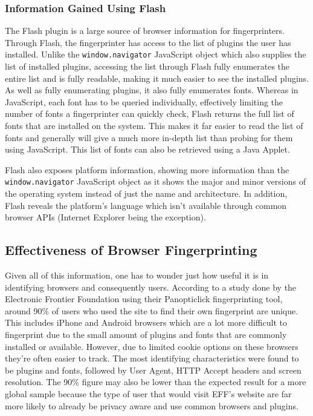\subsubsection{Information Gained Using Flash}

The Flash plugin is a large source of browser information for fingerprinters.
Through Flash, the fingerprinter has access to the list of plugins the user has installed.
Unlike the \texttt{window.navigator} JavaScript object which also supplies the list of installed plugins, accessing the list through Flash fully enumerates the entire list and is fully readable, making it much easier to see the installed plugins.
As well as fully enumerating plugins, it also fully enumerates fonts.
Whereas in JavaScript, each font has to be queried individually, effectively limiting the number of fonts a fingerprinter can quickly check, Flash returns the full list of fonts that are installed on the system.
This makes it far easier to read the list of fonts and generally will give a much more in-depth list than probing for them using JavaScript.
This list of fonts can also be retrieved using a Java Applet.

Flash also exposes platform information, showing more information than the \texttt{window.navigator} JavaScript object as it shows the major and minor versions of the operating system instead of just the name and architecture.
In addition, Flash reveals the platform's language which isn't available through common browser APIs (Internet Explorer being the exception).

\subsection{Effectiveness of Browser Fingerprinting}

Given all of this information, one has to wonder just how useful it is in identifying browsers and consequently users.
According to a study done by the Electronic Frontier Foundation \citep{browser-uniqueness} using their Panopticlick fingerprinting tool, around 90\% of users who used the site to find their own fingerprint are unique.
This includes iPhone and Android browsers which are a lot more difficult to fingerprint due to the small amount of plugins and fonts that are commonly installed or available.
However, due to limited cookie options on these browsers they're often easier to track.
The most identifying characteristics were found to be plugins and fonts, followed by User Agent, HTTP Accept headers and screen resolution.
The 90\% figure may also be lower than the expected result for a more global sample because the type of user that would visit EFF's website are far more likely to already be privacy aware and use common browsers and plugins.

